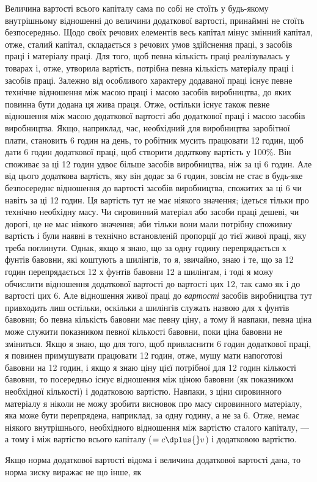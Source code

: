 
Величина вартості всього капіталу сама по собі не стоїть
у будь-якому внутрішньому відношенні до величини додаткової
вартості, принаймні не стоїть безпосередньо. Щодо своїх речових
елементів весь капітал мінус змінний капітал, отже, сталий капітал,
складається з речових умов здійснення праці, з засобів праці
і матеріалу праці. Для того, щоб певна кількість праці реалізувалась
у товарах і, отже, утворила вартість, потрібна певна
кількість матеріалу праці і засобів праці. Залежно від особливого
характеру додаваної праці існує певне технічне відношення
між масою праці і масою засобів виробництва, до яких повинна
бути додана ця жива праця. Отже, остільки існує також певне
відношення між масою додаткової вартості або додаткової праці
і масою засобів виробництва. Якщо, наприклад, час, необхідний
для виробництва заробітної плати, становить 6 годин на день,
то робітник мусить працювати 12 годин, щоб дати 6 годин додаткової
праці, щоб створити додаткову вартість у 100\%. Він
споживає за ці 12 годин удвоє більше засобів виробництва, ніж
за ці 6 годин. Але від цього додаткова вартість, яку він додає
за 6 годин, зовсім не стає в будь-яке безпосереднє відношення
до вартості засобів виробництва, спожитих за ці 6 чи навіть
за ці 12 годин. Ця вартість тут не має ніякого значення; ідеться
тільки про технічно необхідну масу. Чи сировинний матеріал або
засоби праці дешеві, чи дорогі, це не має ніякого значення;
аби тільки вони мали потрібну споживну вартість і були наявні
в технічно встановленій пропорції до тієї живої праці, яку треба
поглинути. Однак, якщо я знаю, що за одну годину перепрядається
$х$ фунтів бавовни, які коштують $а$ шилінгів, то я, звичайно,
знаю і те, що за 12 годин перепрядається 12 $х$ фунтів
бавовни \deq{} 12 $а$ шилінгам, і тоді я можу обчислити відношення
додаткової вартості до вартості цих 12, так само як і до вартості
цих 6. Але відношення живої праці до \emph{вартості} засобів
виробництва тут привходить лиш остільки, оскільки $а$ шилінгів
служать назвою для $х$ фунтів бавовни; бо певна кількість бавовни
має певну ціну, а тому й навпаки, певна ціна може служити
показником певної кількості бавовни, поки ціна бавовни
не зміниться. Якщо я знаю, що для того, щоб привласнити 6 годин
додаткової праці, я повинен примушувати працювати 12 годин,
отже, мушу мати напоготові бавовни на 12 годин, і якщо я знаю
ціну цієї потрібної для 12 годин кількості бавовни, то посередньо
існує відношення між ціною бавовни (як показником необхідної
кількості) і додатковою вартістю. Навпаки, з ціни сировинного
матеріалу я ніколи не можу зробити висновок про масу сировинного
матеріалу, яка може бути перепрядена, наприклад, за
одну годину, а не за 6. Отже, немає ніякого внутрішнього, необхідного
відношення між вартістю сталого капіталу, — а тому
і між вартістю всього капіталу ($= c \dplus{} v$) і додатковою вартістю.

Якщо норма додаткової вартості відома і величина додаткової
вартості дана, то норма зиску виражає не що інше, як
\parbreak{}  %
